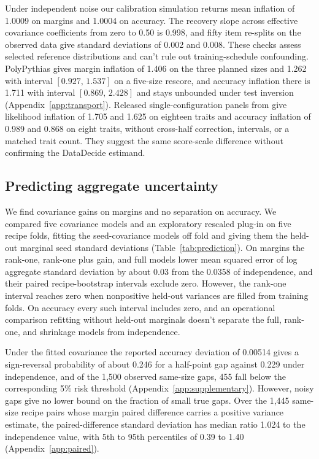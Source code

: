 \documentclass{article}
\newcommand{\ci}[2]{\ensuremath{[#1,\,#2]}}
\begin{document}
Under independent noise our calibration simulation returns mean inflation of 1.0009 on margins and 1.0004 on accuracy. The recovery slope across effective covariance coefficients from zero to 0.50 is 0.998, and fifty item re-splits on the observed data give standard deviations of 0.002 and 0.008. These checks assess selected reference distributions and can't rule out training-schedule confounding. PolyPythias gives margin inflation of 1.406 on the three planned sizes and 1.262 with interval \ci{0.927}{1.537} on a five-size rescore, and accuracy inflation there is 1.711 with interval \ci{0.869}{2.428} and stays unbounded under test inversion (Appendix~\ref{app:transport}). Released single-configuration panels from \citet{heineman2025} give likelihood inflation of 1.705 and 1.625 on eighteen traits and accuracy inflation of 0.989 and 0.868 on eight traits, without cross-half correction, intervals, or a matched trait count. They suggest the same score-scale difference without confirming the DataDecide estimand.

\subsection{Predicting aggregate uncertainty}
\label{sec:prediction}
We find covariance gains on margins and no separation on accuracy. We compared five covariance models and an exploratory rescaled plug-in on five recipe folds, fitting the seed-covariance models off fold and giving them the held-out marginal seed standard deviations (Table~\ref{tab:prediction}). On margins the rank-one, rank-one plus gain, and full models lower mean squared error of log aggregate standard deviation by about 0.03 from the 0.0358 of independence, and their paired recipe-bootstrap intervals exclude zero. However, the rank-one interval reaches zero when nonpositive held-out variances are filled from training folds. On accuracy every such interval includes zero, and an operational comparison refitting without held-out marginals doesn't separate the full, rank-one, and shrinkage models from independence.

Under the fitted covariance the reported accuracy deviation of 0.00514 gives a sign-reversal probability of about 0.246 for a half-point gap against 0.229 under independence, and of the 1,500 observed same-size gaps, 455 fall below the corresponding 5\% risk threshold (Appendix~\ref{app:supplementary}). However, noisy gaps give no lower bound on the fraction of small true gaps. Over the 1,445 same-size recipe pairs whose margin paired difference carries a positive variance estimate, the paired-difference standard deviation has median ratio 1.024 to the independence value, with 5th to 95th percentiles of 0.39 to 1.40 (Appendix~\ref{app:paired}).
\end{document}
